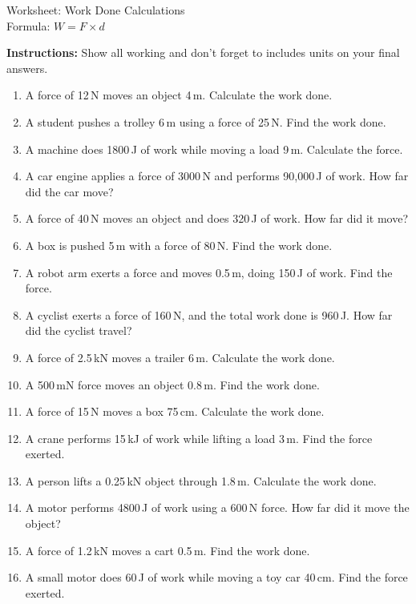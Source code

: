 \documentclass[12pt]{article}
\begin{document}
\begin{center}
{\LARGE Worksheet: Work Done Calculations}\\[0.5em]
{\large Formula: $W = F \times d$}
\end{center}

\vspace{1em}

\textbf{Instructions:} Show all working and don't forget to includes units on your final answers. 

\vspace{1em}

\begin{enumerate}
\item A force of 12\,N moves an object 4\,m. Calculate the work done.
\item A student pushes a trolley 6\,m using a force of 25\,N. Find the work done.
\item A machine does 1800\,J of work while moving a load 9\,m. Calculate the force.
\item A car engine applies a force of 3000\,N and performs 90{,}000\,J of work. How far did the car move?
\item A force of 40\,N moves an object and does 320\,J of work. How far did it move?
\item A box is pushed 5\,m with a force of 80\,N. Find the work done.
\item A robot arm exerts a force and moves 0.5\,m, doing 150\,J of work. Find the force.
\item A cyclist exerts a force of 160\,N, and the total work done is 960\,J. How far did the cyclist travel?

\item A force of 2.5\,kN moves a trailer 6\,m. Calculate the work done.
\item A 500\,mN force moves an object 0.8\,m. Find the work done.
\item A force of 15\,N moves a box 75\,cm. Calculate the work done.
\item A crane performs 15\,kJ of work while lifting a load 3\,m. Find the force exerted.
\item A person lifts a 0.25\,kN object through 1.8\,m. Calculate the work done.
\item A motor performs 4800\,J of work using a 600\,N force. How far did it move the object?
\item A force of 1.2\,kN moves a cart 0.5\,m. Find the work done.
\item A small motor does 60\,J of work while moving a toy car 40\,cm. Find the force exerted.


\end{enumerate}
\end{document}
